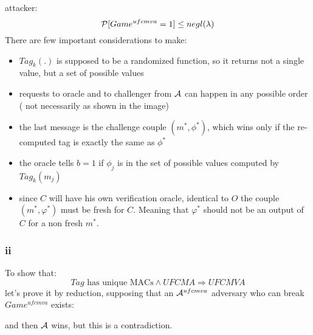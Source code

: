 \documentclass[11pt]{article}
\newcounter{t0d0_counter}
\begin{document}
attacker:
\[
    \P [ Game^{ufcmva}=1 ] \leq negl(\lambda)  
\]
There are few important considerations to make:
\begin{itemize}
    \item $Tag_{k}(.)$ is supposed to be a randomized function, so it returns
        not a single value, but a set of possible values
    \item requests to oracle and to challenger from $\A$ can happen in any
        possible order ( not necessarily as shown in the image)
    \item the last message is the challenge couple $(m^{*}, \phi^{*})$, which
            wins only if the re-computed tag is exactly the same as $\phi^{*}$
    \item the oracle tells $b=1$ if $\phi_{j}$ is in the set of possible values
        computed by $Tag_{k}(m_{j})$
    \item since $C$ will have his own verification oracle, identical to $O$ the couple $(m^*,\varphi^*)$ must be fresh for $C$. Meaning that $\varphi^*$ should not be an output of $C$ for a non fresh $m^*$. 
\end{itemize}

\subsubsection{ ii }
To show that:
\[
   Tag \text{ has unique MACs} \wedge UFCMA \Rightarrow UFCMVA
\]
 let's prove it by reduction, supposing that an $\A^{ufcmva}$ adversary who can
 break $Game^{ufcmva}$ exists:

\begin{figure}[h!]
   \centering
   \sdinit{}
\end{figure}
and then $\A$ wins, but this is a contradiction.\\
\end{document}
